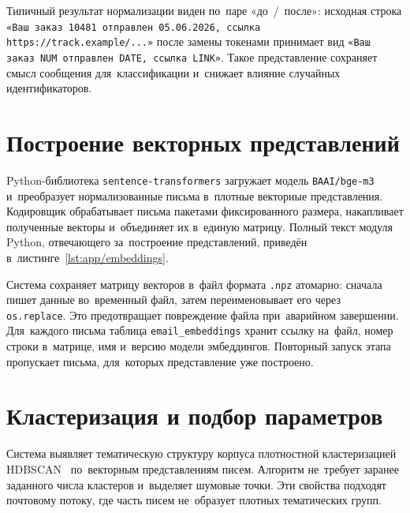Типичный результат нормализации виден по~паре «до~/~после»: исходная строка
\texttt{«Ваш заказ 10481 отправлен 05.06.2026, ссылка https://track.example/...»}
после замены токенами принимает вид
\texttt{«Ваш заказ NUM отправлен DATE, ссылка LINK»}. Такое представление
сохраняет смысл сообщения для~классификации и~снижает влияние случайных
идентификаторов.

\section{Построение векторных представлений}\label{sec:ch3/embed}

Python-библиотека \texttt{sentence-transformers} загружает модель
\texttt{BAAI/bge-m3} и~преобразует нормализованные письма в~плотные векторные
представления. Кодировщик обрабатывает письма пакетами фиксированного размера,
накапливает полученные векторы и~объединяет их в~единую матрицу. Полный текст
модуля Python, отвечающего за~построение представлений, приведён
в~листинге~\ref{lst:app/embeddings}.

Система сохраняет матрицу векторов в~файл формата \texttt{.npz} атомарно:
сначала пишет данные во~временный файл, затем переименовывает его через
\texttt{os.replace}. Это предотвращает повреждение файла при~аварийном
завершении. Для~каждого письма таблица \texttt{email\_embeddings} хранит ссылку
на~файл, номер строки в~матрице, имя и~версию модели эмбеддингов. Повторный
запуск этапа пропускает письма, для~которых представление уже построено.

\section{Кластеризация и подбор параметров}\label{sec:ch3/cluster}

Система выявляет тематическую структуру корпуса плотностной кластеризацией
HDBSCAN~\cite{McInnes2017HDBSCAN} по~векторным представлениям писем. Алгоритм
не~требует заранее заданного числа кластеров и~выделяет шумовые точки. Эти
свойства подходят почтовому потоку, где часть писем не~образует плотных
тематических групп.

